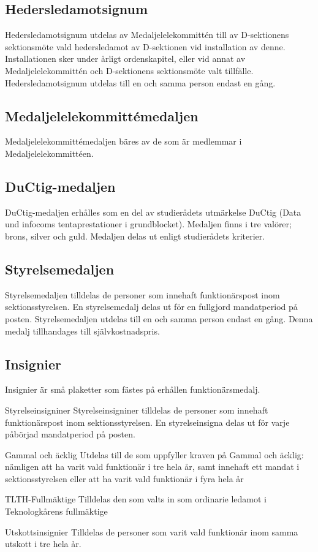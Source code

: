 \documentclass[pdfbookmarks,a4paper,11pt]{article}
\newlength{\itemcollength}
\newenvironment{reglemlista}{%
  \begin{list}{}{%
      \setlength{\labelwidth}{\itemcollength}%
      \setlength{\leftmargin}{\labelwidth + \labelsep}%
      \renewcommand{\makelabel}[1]{%
        \raisebox{0pt}[1ex][0pt]{%
          \makebox[\labelwidth][l]{%
            \parbox[t]{\itemcollength}{%
              \raggedright\hspace{0pt}##1}}}\hfill}%
      }}{%
  \end{list}}
\begin{document}
\subsection{Hedersledamotsignum}
Hedersledamotsignum utdelas av Medaljelelekommittén till av D-sektionens sektionsmöte vald hedersledamot av D-sektionen vid installation av denne. Installationen sker under årligt ordenskapitel, eller vid annat av Medaljelelekommittén och D-sektionens sektionsmöte valt tillfälle. Hedersledamotsignum utdelas till en och samma person endast en gång.

\subsection{Medaljelelekommittémedaljen}
Medaljelelekommittémedaljen bäres av de som är medlemmar i Medaljelelekommittéen.

\subsection{DuCtig-medaljen}
DuCtig-medaljen erhålles som en del av studierådets utmärkelse DuCtig (Data und infocoms tentaprestationer i grundblocket). Medaljen finns i tre valörer; brons, silver och guld. Medaljen delas ut enligt studierådets kriterier.

\subsection{Styrelsemedaljen}
Styrelsemedaljen tilldelas de personer som innehaft funktionärspost inom sektionsstyrelsen. En styrelsemedalj delas ut för en fullgjord mandatperiod på posten. Styrelsemedaljen utdelas till en och samma person endast en gång. Denna medalj tillhandages till självkostnadspris.

\subsection{Insignier}
Insignier är små plaketter som fästes på erhållen funktionärsmedalj.

\begin{reglemlista}
	\item[Styrelseinsigniner]
	Styrelseinsigniner tilldelas de personer som innehaft funktionärspost inom sektionsstyrelsen. En styrelseinsigna delas ut för varje påbörjad mandatperiod på posten.
	\item[Gammal och äcklig]
	Utdelas till de som uppfyller kraven på Gammal och äcklig: nämligen att ha varit vald funktionär i tre hela år, samt innehaft ett mandat i sektionsstyrelsen eller att ha varit vald funktionär i fyra hela år
	\item[TLTH-Fullmäktige]
	Tilldelas den som valts in som ordinarie ledamot i Teknologkårens fullmäktige
	\item[Utskottsinsignier]
	Tilldelas de personer som varit vald funktionär inom samma utskott i tre hela år.  
\end{reglemlista}
\end{document}
